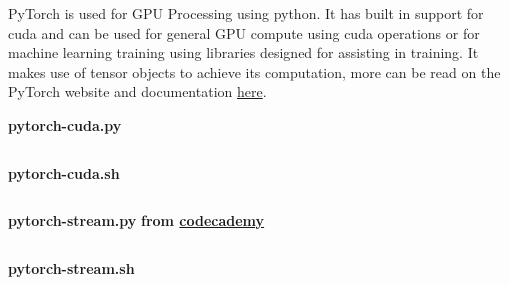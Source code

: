 \begin{usecases}
    PyTorch is used for GPU Processing using python. It has built in support for cuda and can be used for general GPU compute using cuda operations or for machine learning training using libraries designed for assisting in training. It makes use of tensor objects to achieve its computation, more can be read on the PyTorch website and documentation \href{https://pytorch.org/}{here}.
\end{usecases}

\begin{example}
    \noindent\textbf{pytorch-cuda.py}\vspace{-0.5em}
    \inputminted{python3}{source_code/PyTorch/cuda/pytorch-cuda.py} 
    \pagebreak
    \noindent\textbf{pytorch-cuda.sh}\vspace{-0.5em}
    \inputminted{bash}{source_code/PyTorch/cuda/pytorch-cuda.sh}

    \noindent\textbf{pytorch-stream.py}
    \noindent\textbf{from \href{https://www.codecademy.com/resources/docs/pytorch/gpu-acceleration-with-cuda/performance-optimization}{codecademy}}\vspace{-0.5em}
    \inputminted{python3}{source_code/PyTorch/stream/pytorch-stream.py}
    \pagebreak
    \noindent\textbf{pytorch-stream.sh}\vspace{-0.5em}
    \inputminted{bash}{source_code/PyTorch/stream/pytorch-stream.sh}


\end{example}